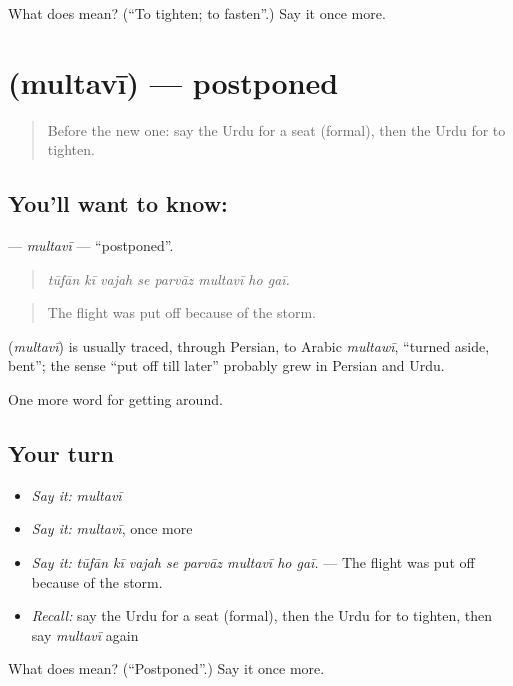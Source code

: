 \begin{tcolorbox}[breakable,colback=teal!4,colframe=teal!35!black,title={Before you move on}]
What does  mean? (\textquotedblleft{}To tighten; to fasten\textquotedblright{}.) Say it once more.
\end{tcolorbox}
\section[\texorpdfstring{\ur{ملتوی} (multavī)}{ملتوی (multavī)}]{ (multavī) — postponed}

\label{lesson:UR-C398-multavi}



\begin{quote}
Before the new one: say the Urdu for a seat (formal), then the Urdu for to tighten.
\end{quote}

\subsection*{You'll want to know: }
\textbf{} — \emph{multavī} — \textquotedblleft{}postponed\textquotedblright{}.

\begin{quote}
       
\end{quote}

\begin{quote}
\emph{tūfān kī vajah se parvāz multavī ho gaī.}
\end{quote}

\begin{quote}
The flight was put off because of the storm.
\end{quote}

\begin{cousinweb}
\textbf{} (\emph{multavī}) is usually traced, through Persian, to Arabic \emph{multawī}, \textquotedblleft{}turned aside, bent\textquotedblright{}; the sense \textquotedblleft{}put off till later\textquotedblright{} probably grew in Persian and Urdu.
\end{cousinweb}

\begin{grammarlens}[title={What you've built}]
One more word for getting around.
\end{grammarlens}

\subsection*{Your turn}
\begin{itemize}
\raggedright
  \item \emph{Say it:} \emph{multavī}
  \item \emph{Say it:} \emph{multavī}, once more
  \item \emph{Say it:} \emph{tūfān kī vajah se parvāz multavī ho gaī.} — The flight was put off because of the storm.
  \item \emph{Recall:} say the Urdu for a seat (formal), then the Urdu for to tighten, then say \emph{multavī} again
\end{itemize}

\begin{tcolorbox}[breakable,colback=teal!4,colframe=teal!35!black,title={Before you move on}]
What does  mean? (\textquotedblleft{}Postponed\textquotedblright{}.) Say it once more.
\end{tcolorbox}
